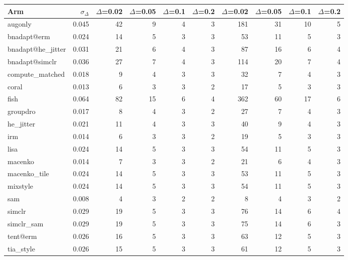\begin{tabular}{lrrrrrrrrr}
\toprule
Arm & $\sigma_\Delta$ & $\Delta$=0.02 & $\Delta$=0.05 & $\Delta$=0.1 & $\Delta$=0.2 & $\Delta$=0.02 & $\Delta$=0.05 & $\Delta$=0.1 & $\Delta$=0.2 \\
\midrule
augonly & 0.045 & 42 & 9 & 4 & 3 & 181 & 31 & 10 & 5 \\
bnadapt@erm & 0.024 & 14 & 5 & 3 & 3 & 53 & 11 & 5 & 3 \\
bnadapt@he\_jitter & 0.031 & 21 & 6 & 4 & 3 & 87 & 16 & 6 & 4 \\
bnadapt@simclr & 0.036 & 27 & 7 & 4 & 3 & 114 & 20 & 7 & 4 \\
compute\_matched & 0.018 & 9 & 4 & 3 & 3 & 32 & 7 & 4 & 3 \\
coral & 0.013 & 6 & 3 & 3 & 2 & 17 & 5 & 3 & 3 \\
fish & 0.064 & 82 & 15 & 6 & 4 & 362 & 60 & 17 & 6 \\
groupdro & 0.017 & 8 & 4 & 3 & 2 & 27 & 7 & 4 & 3 \\
he\_jitter & 0.021 & 11 & 4 & 3 & 3 & 40 & 9 & 4 & 3 \\
irm & 0.014 & 6 & 3 & 3 & 2 & 19 & 5 & 3 & 3 \\
lisa & 0.024 & 14 & 5 & 3 & 3 & 54 & 11 & 5 & 3 \\
macenko & 0.014 & 7 & 3 & 3 & 2 & 21 & 6 & 4 & 3 \\
macenko\_tile & 0.024 & 14 & 5 & 3 & 3 & 53 & 11 & 5 & 3 \\
mixstyle & 0.024 & 14 & 5 & 3 & 3 & 54 & 11 & 5 & 3 \\
sam & 0.008 & 4 & 3 & 2 & 2 & 8 & 4 & 3 & 2 \\
simclr & 0.029 & 19 & 5 & 3 & 3 & 76 & 14 & 6 & 4 \\
simclr\_sam & 0.029 & 19 & 5 & 3 & 3 & 75 & 14 & 6 & 3 \\
tent@erm & 0.026 & 16 & 5 & 3 & 3 & 63 & 12 & 5 & 3 \\
tia\_style & 0.026 & 15 & 5 & 3 & 3 & 61 & 12 & 5 & 3 \\
\bottomrule
\end{tabular}
